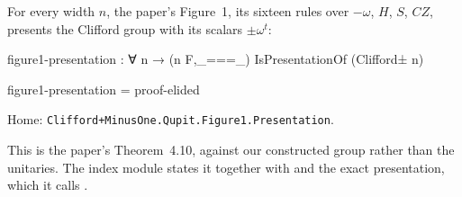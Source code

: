 \begin{theorem}\label{thm:figure1}
For every width $n$, the paper's Figure~1, its sixteen rules over
$-\omega$, $H$, $S$, $CZ$, presents the Clifford group with its scalars
$\pm\omega^t$:
\begin{code}
figure1-presentation : ∀ n → (n F,_===_) IsPresentationOf (Clifford± n)
\end{code}
\begin{code}[hide]
figure1-presentation = proof-elided
\end{code}
\noindent Home: \texttt{Clifford+MinusOne.Qupit.Figure1.Presentation}.
\end{theorem}

\noindent This is the paper's Theorem~4.10, against our constructed
group rather than the unitaries.  The index module states it together
with  and the exact presentation, which it
calls .

